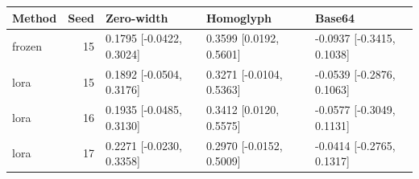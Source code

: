 \begin{tabular}{lrlll}
\toprule
Method & Seed & Zero-width & Homoglyph & Base64\\\midrule
frozen & 15 & 0.1795 [-0.0422, 0.3024] & 0.3599 [0.0192, 0.5601] & -0.0937 [-0.3415, 0.1038]\\
lora & 15 & 0.1892 [-0.0504, 0.3176] & 0.3271 [-0.0104, 0.5363] & -0.0539 [-0.2876, 0.1063]\\
lora & 16 & 0.1935 [-0.0485, 0.3130] & 0.3412 [0.0120, 0.5575] & -0.0577 [-0.3049, 0.1131]\\
lora & 17 & 0.2271 [-0.0230, 0.3358] & 0.2970 [-0.0152, 0.5009] & -0.0414 [-0.2765, 0.1317]\\
\bottomrule\end{tabular}
